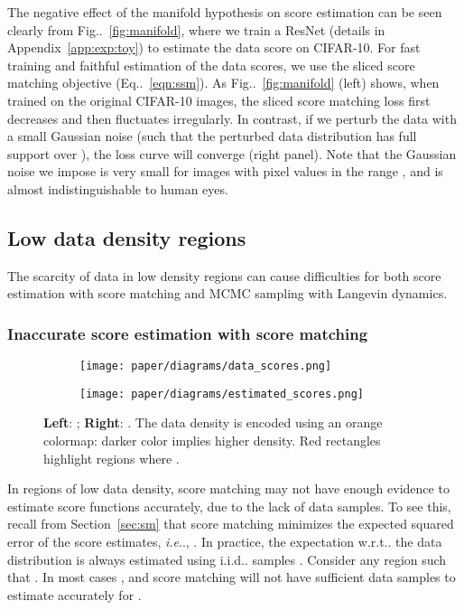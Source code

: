 \documentclass{article}
\makeatletter
\def\@onedot{\ifx\@let@token.\else.\null\fi\xspace}
\DeclareRobustCommand\onedot{\futurelet\@let@token\@onedot}
\newcommand{\eqnref}[1]{Eq\onedot~\eqref{#1}}
\newcommand{\figref}[1]{Fig\onedot~\ref{#1}}
\newcommand{\secref}[1]{Section~\ref{#1}}
\def\ie{\emph{i.e}\onedot}
\def\wrt{w.r.t\onedot}
\def\iid{i.i.d\onedot}
\makeatother
\begin{document}
The negative effect of the manifold hypothesis on score estimation can be seen clearly from \figref{fig:manifold}, where we train a ResNet (details in Appendix~\ref{app:exp:toy}) to estimate the data score on CIFAR-10. For fast training and faithful estimation of the data scores, we use the sliced score matching objective (\eqnref{eqn:ssm}). As \figref{fig:manifold} (left) shows, when trained on the original CIFAR-10 images, the sliced score matching loss first decreases 
and then fluctuates irregularly. In contrast, if we perturb the data with a small Gaussian noise (such that the perturbed data distribution has full support over ), the loss curve will converge (right panel). Note that the Gaussian noise  we impose is very small for images with pixel values in the range , and is almost indistinguishable to human eyes.
\subsection{Low data density regions}\label{sec:low_density}
The scarcity of data in low density regions can cause difficulties for both score estimation with score matching and MCMC sampling with Langevin dynamics.
\subsubsection{Inaccurate score estimation with score matching}\label{sec:inaccuratesm}
\begin{wrapfigure}[15]{r}{0.5\linewidth}
\centering
\vspace{-1em}
\begin{subfigure}{0.5\linewidth}
\centering
\texttt{[image: paper/diagrams/data\_scores.png]}
\end{subfigure}\begin{subfigure}{0.5\linewidth}
\centering
\texttt{[image: paper/diagrams/estimated\_scores.png]}
\end{subfigure}
\caption{\textbf{Left}: ; \textbf{Right}: . The data density  is encoded using an orange colormap: darker color implies higher density. Red rectangles highlight regions where . }\label{fig:low_density}
\end{wrapfigure}
In regions of low data density, score matching may not have enough evidence to estimate score functions accurately, due to the lack of data samples. To see this, recall from \secref{sec:sm} that score matching minimizes the expected squared error of the score estimates, \ie, . In practice, the expectation \wrt the data distribution is always estimated using \iid samples . Consider any region  such that . In most cases , and score matching will not have sufficient data samples to estimate  accurately for .
\end{document}
